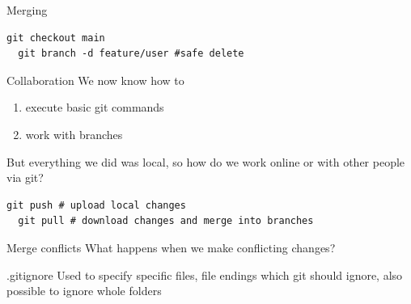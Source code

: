 \documentclass{beamer}
\begin{document}
\begin{frame}[fragile,t]{Merging}\vspace{10pt}
  \begin{lstlisting}[basicstyle=\ttfamily\tiny]
  git checkout main
  git branch -d feature/user #safe delete
  \end{lstlisting}\vspace{10pt}
\end{frame}

\begin{frame}[fragile,t]{Collaboration}\vspace{10pt}
  We now know how to 
  \begin{enumerate}
    \item execute basic git commands
    \item work with branches
  \end{enumerate}\vspace{10pt}
  But everything we did was local, so how do we work online or with other people via git?

  \begin{lstlisting}[basicstyle=\ttfamily\tiny]
  git push # upload local changes
  git pull # download changes and merge into branches\end{lstlisting}\vspace{10pt}

\end{frame}


\begin{frame}[fragile,t]{Merge conflicts}\vspace{10pt}
  What happens when we make conflicting changes?


\end{frame}

\begin{frame}[fragile,t]{.gitignore}\vspace{10pt}
  Used to specify specific files, file endings which git should ignore, also possible to ignore whole folders
\end{frame}
\end{document}
